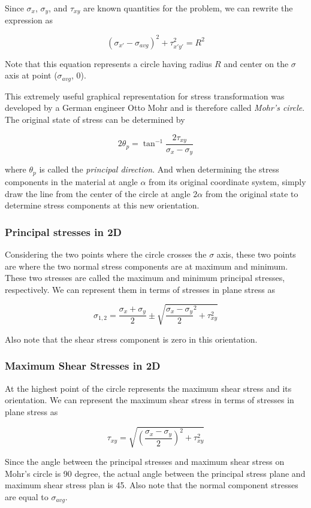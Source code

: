 \documentclass[a4paper,openany,nobib]{tufte-book}
\begin{document}
Since \(\sigma_x\), \(\sigma_y\), and \(\tau_{xy}\) are known quantities for
the problem, we can rewrite the expression as

$$(\sigma_{x'} - \sigma_{avg})^2 + \tau_{x'y'}^2 = R^2$$

Note that this equation represents a circle having radius \(R\) and center
on the \(\sigma\) axis at point (\(\sigma_{avg}\), 0).


This extremely useful graphical representation for stress transformation
was developed by a German engineer Otto Mohr and is therefore called
\emph{Mohr's circle}. The original state of stress can be determined by

$$2\theta_p = \tan ^{-1}\frac{2\tau_{xy}}{\sigma_x - \sigma_y}$$

where \(\theta _p\) is called the \emph{principal direction}. And when
determining the stress components in the material at angle \(\alpha\) from
its original coordinate system, simply draw the line from the center of
the circle at angle \(2\alpha\) from the original state to determine
stress components at this new orientation.

\subsubsection{Principal stresses in 2D}
\label{principal-stresses-in-2d}
Considering the two points where the circle crosses the \(\sigma\) axis,
these two points are where the two normal stress components are at
maximum and minimum. These two stresses are called the maximum and
minimum principal stresses, respectively. We can represent them in terms
of stresses in plane stress as

$$\sigma_{1,2} = \frac{\sigma_x + \sigma_y}{2} \pm \sqrt {\frac{\sigma_x - \sigma_y}{2}^2 + \tau_{xy}^2}$$

Also note that the shear stress component is zero in this orientation.

\subsubsection{Maximum Shear Stresses in 2D}
\label{maximum-shear-stresses-in-2d}
At the highest point of the circle represents the maximum shear stress
and its orientation. We can represent the maximum shear stress in terms
of stresses in plane stress as

$$ \tau_{xy} = \sqrt {\left( \frac{\sigma_x - \sigma_y}{2} \right)^2 + \tau_{xy}^2}$$

Since the angle between the principal stresses and maximum shear stress
on Mohr's circle is 90 degree, the actual angle between the principal
stress plane and maximum shear stress plan is 45. Also note that the
normal component stresses are equal to \(\sigma_{avg}\).
\end{document}
